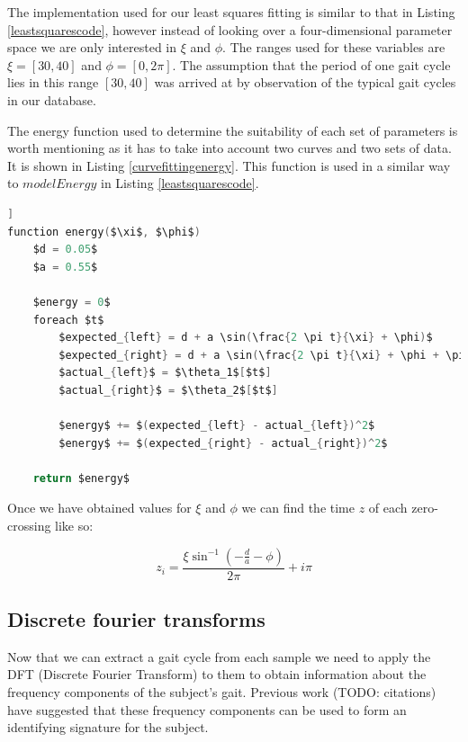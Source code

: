 The implementation used for our least squares fitting is similar to that in Listing \ref{leastsquarescode}, however instead of looking over a four-dimensional parameter space we are only interested in $\xi$ and $\phi$.
The ranges used for these variables are $\xi = [30, 40]$ and $\phi = [0, 2\pi]$.
The assumption that the period of one gait cycle lies in this range $[30, 40]$ was arrived at by observation of the typical gait cycles in our database.

The energy function used to determine the suitability of each set of parameters is worth mentioning as it has to take into account two curves and two sets of data.
It is shown in Listing \ref{curvefittingenergy}.
This function is used in a similar way to $modelEnergy$ in Listing \ref{leastsquarescode}.

\begin{lstlisting}[firstnumber=1,language=c,morekeywords={step,function,foreach,in},frame=single,mathescape=true,caption={Energy function pseudo-code},label={curvefittingenergy},float=[tb]]
function energy($\xi$, $\phi$)
	$d = 0.05$
	$a = 0.55$
	
	$energy = 0$
	foreach $t$
		$expected_{left} = d + a \sin(\frac{2 \pi t}{\xi} + \phi)$
		$expected_{right} = d + a \sin(\frac{2 \pi t}{\xi} + \phi + \pi)$
		$actual_{left}$ = $\theta_1$[$t$]
		$actual_{right}$ = $\theta_2$[$t$]
		
		$energy$ += $(expected_{left} - actual_{left})^2$
		$energy$ += $(expected_{right} - actual_{right})^2$
	
	return $energy$
\end{lstlisting}

Once we have obtained values for $\xi$ and $\phi$ we can find the time $z$ of each zero-crossing like so:

\begin{equation}
	z_i = \frac{\xi \sin^{-1}(-\frac{d}{a} - \phi)}{2\pi} + i\pi
\end{equation}


\subsection{Discrete fourier transforms}

Now that we can extract a gait cycle from each sample we need to apply the DFT (Discrete Fourier Transform) to them to obtain information about the frequency components of the subject's gait.
Previous work (TODO: citations) have suggested that these frequency components can be used to form an identifying signature for the subject.

